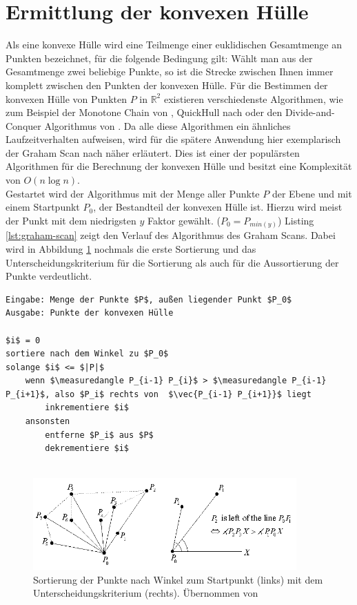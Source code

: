 \section{Ermittlung der konvexen Hülle}

Als eine konvexe Hülle wird eine Teilmenge einer euklidischen Gesamtmenge an Punkten bezeichnet, für die folgende Bedingung gilt: Wählt man aus der Gesamtmenge zwei beliebige Punkte, so ist die Strecke zwischen Ihnen immer komplett zwischen den Punkten der konvexen Hülle. Für die Bestimmen der konvexen Hülle von Punkten \(P\) in \( \mathbb{R}^2\) existieren verschiedenste Algorithmen, wie zum Beispiel der Monotone Chain von \citet{andrew1979another}, QuickHull nach \citet{eddy1977new} oder den Divide-and-Conquer Algorithmus von \citet{preparata1985convex}. Da alle diese Algorithmen ein ähnliches Laufzeitverhalten aufweisen, wird für die spätere Anwendung hier exemplarisch der Graham Scan nach \citet{graham1972efficient} näher erläutert. Dies ist einer der populärsten Algorithmen für die Berechnung der konvexen Hülle und besitzt eine Komplexität von \(O(n \log n)\).\\

Gestartet wird der Algorithmus mit der Menge aller Punkte \(P\) der Ebene und mit einem Startpunkt \(P_0\), der Bestandteil der konvexen Hülle ist. Hierzu wird meist der Punkt mit dem niedrigsten \(y\) Faktor gewählt. (\(P_0=P_{min(y)}\)) Listing \ref{lst:graham-scan} zeigt den Verlauf des Algorithmus des Graham Scans. Dabei wird in Abbildung \ref{fig:convexhull} nochmals die erste Sortierung und das Unterscheidungskriterium für die Sortierung als auch für die Aussortierung der Punkte verdeutlicht. \citep{convexHull} \\


\begin{lstlisting}[mathescape,caption=Graham Scan Algorithmus, label=lst:graham-scan, float=htbp]
Eingabe: Menge der Punkte $P$, außen liegender Punkt $P_0$
Ausgabe: Punkte der konvexen Hülle

$i$ = 0
sortiere nach dem Winkel zu $P_0$
solange $i$ <= $|P|$
    wenn $\measuredangle P_{i-1} P_{i}$ > $\measuredangle P_{i-1} P_{i+1}$, also $P_i$ rechts von  $\vec{P_{i-1} P_{i+1}}$ liegt
        inkrementiere $i$
    ansonsten
        entferne $P_i$ aus $P$
        dekrementiere $i$
    
\end{lstlisting} 

\begin{figure}[h]
  \centering
	\includegraphics[width=0.9\textwidth]{content/images/methods/convexhull.png} 
  \caption{Sortierung der Punkte nach Winkel zum Startpunkt (links) mit dem Unterscheidungskriterium (rechts). Übernommen von \citet{convexHull}}
  \label{fig:convexhull}
\end{figure}
